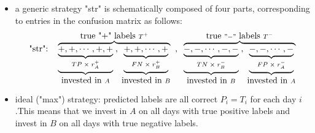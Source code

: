 \documentclass{article}
\begin{document}
\medskip
\begin{itemize}[nosep]
\item a generic strategy "str" is schematically composed of four parts, corresponding to entries in the confusion matrix as follows:
\begin{equation*}
\hbox{"str":} \quad \overbrace{\underbrace{\underbrace{ +,+,\cdots ,+,+}_{TP\; \times\; r_{A}^{+}}}_{\hbox{invested in } A}\; , 
    \;\underbrace{\underbrace{+,+,\cdots, + }_{FN\; \times \; r_{B}^{+}}}_{\hbox{invested in } B}}^{\hbox{true "+" labels }T^{+}}
    \;\; , \;\; 
\overbrace{\underbrace{\underbrace{-,-,\cdots  ,-,-}_{TN\; \times\; r_{B}^{-}}}_{\hbox{invested in } B}\; , \; 
\underbrace{\underbrace{ -,-,\cdots ,-}_{FP\; \times \; r_{A}^{-}}}_{\hbox{invested in } A}}^{\hbox{true }"-"
\hbox{ labels } T^{-}} 
\end{equation*}
\begin{comment}
Therefore,
\begin{equation}
    R^{str} \approx \text{TP}\cdot r_{A}^{+} + \text{FN}\cdot r_{B}^{+} + \text{TN}\cdot r_{B}^{-} +
    \text{FP}\cdot r_{A}^{-}
    \label{strategy_return}
\end{equation}
\end{comment}
\medskip

\item ideal ("max") strategy: predicted labels are all correct $P_{i}=T_{i}$ for each day $i$.This means that we invest in $A$ on all days with true positive labels and invest in
$B$ on all days with true negative labels. 
\begin{comment}
\begin{equation*}
    \hbox{"max" Strategy:}  \quad \overbrace{\underbrace{\underbrace{ +,+,\cdots, \cdots ,
    \cdots, +,+ }_{\hbox{true "+" labels } T^{+}} }_{\hbox{invested in } A}}^{\hbox{predicted "+" labels }P^{+}}
    \; , \; 
\overbrace{
\underbrace{\underbrace{-,-,\cdots,\cdots,\cdots,-,-}_{\hbox{true }"-"\hbox{ labels } T^{-}}}_{\hbox{invested in } B}}^{\hbox{predicted }"-"
\hbox{ labels } P^{-}} 
\end{equation*}


\end{comment}
\end{itemize}
\end{document}
